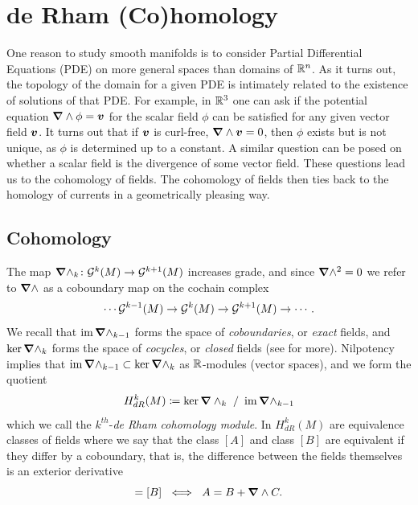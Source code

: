 \documentclass{article}
\begin{document}
\section{de Rham (Co)homology}
\label{sec:derham}

One reason to study smooth manifolds is to consider Partial Differential Equations (PDE) on more general spaces than domains of $\mathbb{R}^n$. As it turns out, the topology of the domain for a given PDE is intimately related to the existence of solutions of that PDE. For example, in $\mathbb{R}^3$ one can ask if the potential equation $\boldsymbol{\nabla} \wedge \phi = \boldsymbol{v}$ for the scalar field $\phi$ can be satisfied for any given vector field $\boldsymbol{v}$. It turns out that if $\boldsymbol{v}$ is curl-free, $\boldsymbol{\nabla} \wedge \boldsymbol{v}=0$, then $\phi$ exists but is not unique, as $\phi$ is determined up to a constant. A similar question can be posed on whether a scalar field is the divergence of some vector field. These questions lead us to the cohomology of fields. The cohomology of fields then ties back to the homology of currents in a geometrically pleasing way.

\subsection{Cohomology}
The map $\boldsymbol{\nabla} \wedge_k \colon \mathcal{G}^k(M) \to \mathcal{G}^{k+1}(M)$ increases grade, and since $\boldsymbol{\nabla} \wedge ^2=0$ we refer to $\boldsymbol{\nabla} \wedge$ as a coboundary map on the cochain complex
\begin{equation}
\cdots \mathcal{G}^{k-1}(M) \to \mathcal{G}^k(M) \to \mathcal{G}^{k+1}(M) \to \cdots.
\end{equation}
We recall that $\operatorname{im} \boldsymbol{\nabla}\wedge_{k-1}$ forms the space of \emph{coboundaries}, or \emph{exact} fields, and $\ker \boldsymbol{\nabla}\wedge_{k}$ forms the space of \emph{cocycles}, or \emph{closed} fields (see \cite{schwarz_hodge_1995} for more). Nilpotency implies that $\operatorname{im} \boldsymbol{\nabla}\wedge_{k-1} \subset \ker \boldsymbol{\nabla}\wedge_{k}$ as $\mathbb{R}$-modules (vector spaces), and we form the quotient
\begin{equation}
H^k_{dR}(M) \coloneqq \ker \boldsymbol{\nabla} \wedge_k ~/~ \operatorname{im} \boldsymbol{\nabla} \wedge_{k-1}
\end{equation}
which we call the $k^{th}$-\emph{de Rham cohomology module}. In $H^k_{dR}(M)$ are equivalence classes of fields where we say that the class $[A]$ and class $[B]$ are equivalent if they differ by a coboundary, that is, the difference between the fields themselves is an exterior derivative
\begin{equation}
[A]=[B] ~ \iff ~ A=B+\grad \wedge C.
\end{equation}
\end{document}
